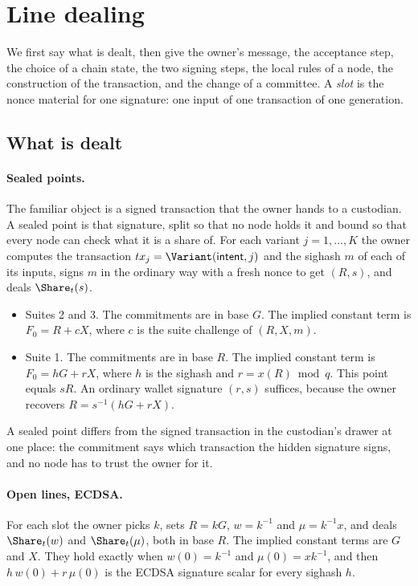 \section{Line dealing}\label{sec:construction}

We first say what is dealt, then give the owner's message, the acceptance step, the choice of a chain state, the two signing steps, the local rules of a node, the construction of the transaction, and the change of a committee. A \emph{slot} is the nonce material for one signature: one input of one transaction of one generation.

\subsection{What is dealt}\label{sec:dealt}

\paragraph{Sealed points.} The familiar object is a signed transaction that the owner hands to a custodian. A sealed point is that signature, split so that no node holds it and bound so that every node can check what it is a share of. For each variant $j = 1,\dots,K$ the owner computes the transaction $tx_j = \Variant(\textsf{intent}, j)$ and the sighash $m$ of each of its inputs, signs $m$ in the ordinary way with a fresh nonce to get $(R, s)$, and deals $\Share_t(s)$.

\begin{itemize}[leftmargin=1.5em]
\item Suites 2 and 3. The commitments are in base $G$. The implied constant term is $F_0 = R + cX$, where $c$ is the suite challenge of $(R, X, m)$.
\item Suite 1. The commitments are in base $R$. The implied constant term is $F_0 = hG + rX$, where $h$ is the sighash and $r = x(R) \bmod q$. This point equals $sR$. An ordinary wallet signature $(r,s)$ suffices, because the owner recovers $R = s^{-1}(hG + rX)$.
\end{itemize}

A sealed point differs from the signed transaction in the custodian's drawer at one place: the commitment says which transaction the hidden signature signs, and no node has to trust the owner for it.

\paragraph{Open lines, ECDSA.} For each slot the owner picks $k$, sets $R = kG$, $w = k^{-1}$ and $\mu = k^{-1}x$, and deals $\Share_t(w)$ and $\Share_t(\mu)$, both in base $R$. The implied constant terms are $G$ and $X$. They hold exactly when $w(0) = k^{-1}$ and $\mu(0) = x k^{-1}$, and then $h\,w(0) + r\,\mu(0)$ is the ECDSA signature scalar for every sighash $h$.


